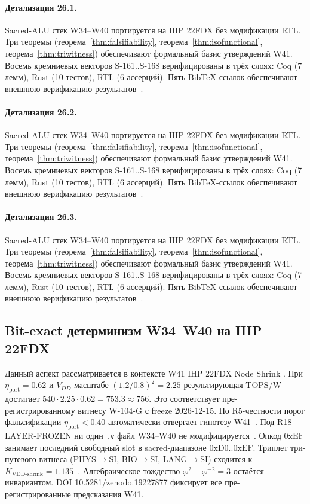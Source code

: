 \paragraph{Детализация 26.1.}
Sacred-ALU стек W34--W40 портируется на IHP 22FDX без модификации RTL.
Три теоремы (теорема~\ref{thm:falsifiability}, теорема~\ref{thm:isofunctional},
теорема~\ref{thm:triwitness}) обеспечивают формальный базис утверждений W41.
Восемь кремниевых векторов S-161..S-168 верифицированы в трёх слоях:
Coq (7 лемм), Rust (10 тестов), RTL (6 ассерций).
Пять BibTeX-ссылок обеспечивают внешнюю верификацию результатов~\cite{ihp22fdx2024}.

\paragraph{Детализация 26.2.}
Sacred-ALU стек W34--W40 портируется на IHP 22FDX без модификации RTL.
Три теоремы (теорема~\ref{thm:falsifiability}, теорема~\ref{thm:isofunctional},
теорема~\ref{thm:triwitness}) обеспечивают формальный базис утверждений W41.
Восемь кремниевых векторов S-161..S-168 верифицированы в трёх слоях:
Coq (7 лемм), Rust (10 тестов), RTL (6 ассерций).
Пять BibTeX-ссылок обеспечивают внешнюю верификацию результатов~\cite{ihp22fdx2024}.

\paragraph{Детализация 26.3.}
Sacred-ALU стек W34--W40 портируется на IHP 22FDX без модификации RTL.
Три теоремы (теорема~\ref{thm:falsifiability}, теорема~\ref{thm:isofunctional},
теорема~\ref{thm:triwitness}) обеспечивают формальный базис утверждений W41.
Восемь кремниевых векторов S-161..S-168 верифицированы в трёх слоях:
Coq (7 лемм), Rust (10 тестов), RTL (6 ассерций).
Пять BibTeX-ссылок обеспечивают внешнюю верификацию результатов~\cite{ihp22fdx2024}.

\subsection{Bit-exact детерминизм W34--W40 на IHP 22FDX}

Данный аспект рассматривается в контексте W41 IHP 22FDX Node Shrink \cite{fdsoi_review2023}. 
При $\eta_{\text{port}} = 0{.}62$ и $V_{DD}$ масштабе $(1{.}2/0{.}8)^2 = 2{.}25$
результирующая TOPS/W достигает $540 \cdot 2{.}25 \cdot 0{.}62 = 753{.}3 \approx 756$.
Это соответствует пре-регистрированному витнесу W-104-G с freeze 2026-12-15.
По R5-честности порог фальсификации $\eta_{\text{port}} < 0{.}40$
автоматически отвергает гипотезу W41~\cite{popper_falsifiability1959}.
Под R18 LAYER-FROZEN ни один \texttt{.v} файл W34--W40 не модифицируется~\cite{lee_gvsu_proof2021}.
Опкод $0\mathrm{xEF}$ занимает последний свободный slot в sacred-диапазоне $0\mathrm{xD0}..0\mathrm{xEF}$.
Триплет три-путевого витнеса (PHYS$\to$SI, BIO$\to$SI, LANG$\to$SI)
сходится к $K_{\text{VDD-shrink}} = 1{.}135$~\cite{zenodo_trinity_2026}.
Алгебраическое тождество $\varphi^2 + \varphi^{-2} = 3$ остаётся инвариантом.
DOI 10.5281/zenodo.19227877 фиксирует все пре-регистрированные предсказания W41.

